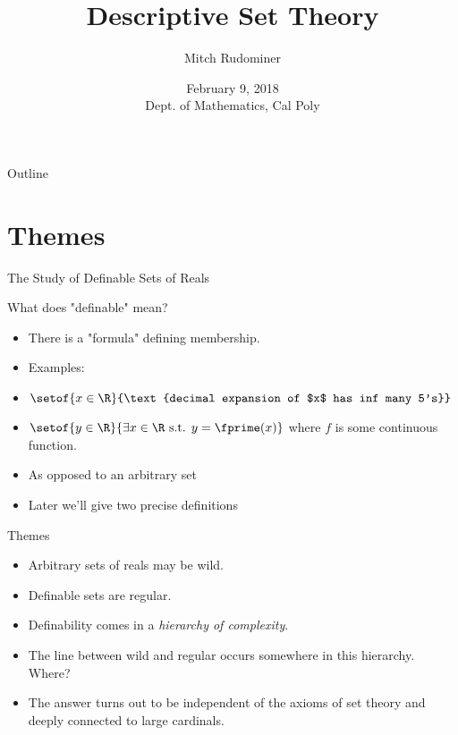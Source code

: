\documentclass{beamer}
\title{Descriptive Set Theory}
\author{Mitch Rudominer}
\institute{Google}
\date
{February 9, 2018 \\ Dept. of Mathematics, Cal Poly }
\begin{document}
\begin{frame}
  \titlepage
\end{frame}

\begin{frame}{Outline}
  \tableofcontents
\end{frame}




\section{Themes}


\begin{frame}{The Study of Definable Sets of Reals}

What does "definable" mean?

\pause

  \begin{itemize}
  \item There is a "formula" defining membership.
  \item Examples:
  \item $\setof{x\in\R}{\text{decimal expansion of $x$ has inf many 5's}}$
  \item $\setof{y\in\R}{\exists x\in\R \text{ s.t. } y=\fprime(x)}$ where $f$ is some continuous function.
  \item As opposed to an arbitrary set
  \item Later we'll give two precise definitions
  \end{itemize}


\end{frame}

\begin{frame}{Themes}

  \begin{itemize}
  \item Arbitrary sets of reals may be wild.
  \item Definable sets are regular.
  \item Definability comes in a \emph{hierarchy of complexity}.
  \item The line between wild and regular occurs somewhere in this
  hierarchy. Where?
  \item The answer turns out to be independent of the axioms of set theory
  and deeply connected to large cardinals.
  \end{itemize}
\end{frame}
\end{document}
